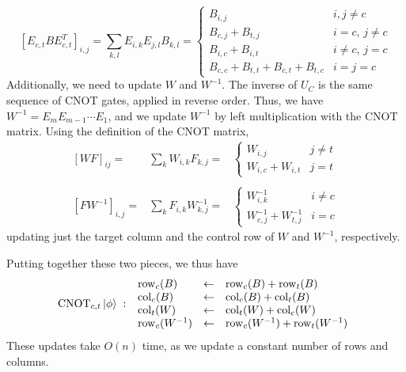 \begin{equation}
\label{eq:cnot_phaseupdate}
\left[E_{c,t}BE_{c,t}^{T}\right]_{i,j} = \sum_{k,l}E_{i,k}E_{j,l}B_{k,l} =
\begin{cases}
B_{i,j} & i,j\neq c \\
B_{c,j}+B_{t,j} & i=c,\,j\neq c\\
B_{i,c}+B_{i,t} & i\neq c,\,j=c\\
B_{c,c}+B_{t,t} + B_{c,t} + B_{t,c} & i=j=c
\end{cases}
\end{equation}
Additionally, we need to update $W$ and $W^{-1}$. The inverse of $U_{C}$ is the same sequence of CNOT gates, applied in reverse order. Thus, we have $W^{-1}=E_{m}E_{m-1}\cdots E_{1}$, and we update $W^{-1}$ by left multiplication with the CNOT matrix. Using the definition of the CNOT matrix,
\[
\begin{array}{rcl}
\left[WF\right]_{ij} = &  \sum_{k}W_{i,k}F_{k,j} = & \begin{cases} W_{i,j} & j\neq t \\ W_{i,c}+W_{i,t} & j=t \end{cases}\\
\\
\left[FW^{-1}\right]_{i,j} = &  \sum_{k}F_{i,k}W_{k,j}^{-1} = & \begin{cases} W^{-1}_{i,k} & i\neq c \\ W^{-1}_{c,j}+W^{-1}_{t,j} & i=c \end{cases}
\end{array}\]
updating just the target column and the control row of $W$ and $W^{-1}$, respectively.\par
Putting together these two pieces, we thus have
\begin{equation}
\text{CNOT}_{c,t}\ket{\phi} \;:\;
\begin{array}{lcl} 
\mathrm{row}_{c}(B) &\gets& \mathrm{row}_{c}(B)+\mathrm{row}_{t}(B)  \\
\mathrm{col}_{c}(B) &\gets& \mathrm{col}_{c}(B)+\mathrm{col}_{t}(B)  \\
\mathrm{col}_{t}(W) &\gets& \mathrm{col}_{t}(W) + \mathrm{col}_{c}(W)  \\
\mathrm{row}_{c}(W^{-1}) &\gets &\mathrm{row}_{c}(W^{-1}) + \mathrm{row}_{t}(W^{-1})
\end{array}
\end{equation}
These updates take $O(n)$ time, as we update a constant number of rows and columns.\par
